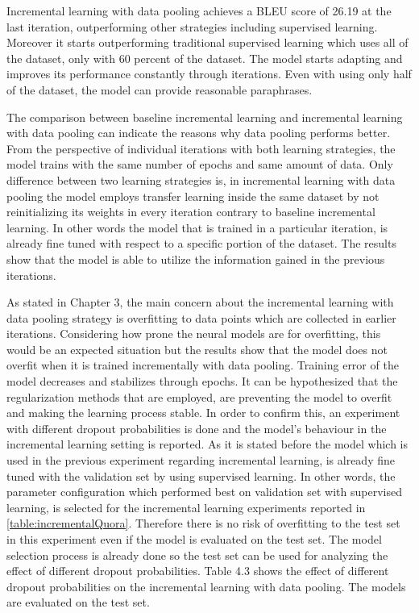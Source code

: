 Incremental learning with data pooling achieves a BLEU score of 26.19 at the last iteration, outperforming other strategies including supervised learning. Moreover it starts outperforming traditional supervised learning which uses all of the dataset, only with 60 percent of the dataset. The model starts adapting and improves its performance constantly through iterations. Even with using only half of the dataset, the model can provide reasonable paraphrases. 

The comparison between baseline incremental learning and incremental learning with data pooling can indicate the reasons why data pooling performs better. From the perspective of individual iterations with both learning strategies, the model trains with the same number of epochs and same amount of data. Only difference between two learning strategies is, in incremental learning with data pooling the model employs transfer learning inside the same dataset by not reinitializing its weights in every iteration contrary to baseline incremental learning. In other words the model that is trained in a particular iteration, is already fine tuned with respect to a specific portion of the dataset. The results show that the model is able to utilize the information gained in the previous iterations.

As stated in Chapter 3, the main concern about the incremental learning with data pooling strategy is overfitting to data points which are collected in earlier iterations. Considering how prone the neural models are for overfitting, this would be an expected situation but the results show that the model does not overfit when it is trained incrementally with data pooling. Training error of the model decreases and stabilizes through epochs. It can be hypothesized that the regularization methods that are employed, are preventing the model to overfit and making the learning process stable. In order to confirm this, an experiment with different dropout probabilities is done and the model's behaviour in the incremental learning setting is reported. As it is stated before the model which is used in the previous experiment regarding incremental learning, is already fine tuned with the validation set by using supervised learning. In other words, the parameter configuration which performed best on validation set with supervised learning, is selected for the incremental learning experiments reported in \ref{table:incrementalQuora}. Therefore there is no risk of overfitting to the test set in this experiment even if the model is evaluated on the test set. The model selection process is already done so the test set can be used for analyzing the effect of different dropout probabilities. Table 4.3 shows the effect of different dropout probabilities on the incremental learning with data pooling. The models are evaluated on the test set.

